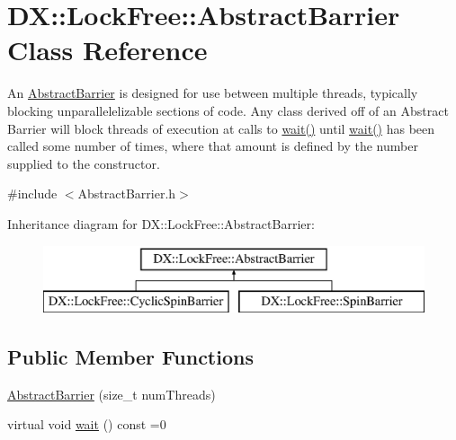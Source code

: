 \hypertarget{class_d_x_1_1_lock_free_1_1_abstract_barrier}{\section{D\-X\-:\-:Lock\-Free\-:\-:Abstract\-Barrier Class Reference}
\label{class_d_x_1_1_lock_free_1_1_abstract_barrier}
}


An \hyperlink{class_d_x_1_1_lock_free_1_1_abstract_barrier}{Abstract\-Barrier} is designed for use between multiple threads, typically blocking unparallelelizable sections of code. Any class derived off of an Abstract Barrier will block threads of execution at calls to \hyperlink{class_d_x_1_1_lock_free_1_1_abstract_barrier_a9040adf7507467e5a653bdaf2fbd17a6}{wait()} until \hyperlink{class_d_x_1_1_lock_free_1_1_abstract_barrier_a9040adf7507467e5a653bdaf2fbd17a6}{wait()} has been called some number of times, where that amount is defined by the number supplied to the constructor.  




{\ttfamily \#include $<$Abstract\-Barrier.\-h$>$}

Inheritance diagram for D\-X\-:\-:Lock\-Free\-:\-:Abstract\-Barrier\-:\begin{figure}[H]
\begin{center}
\leavevmode
\includegraphics[height=2.000000cm]{class_d_x_1_1_lock_free_1_1_abstract_barrier}
\end{center}
\end{figure}
\subsection*{Public Member Functions}
\begin{DoxyCompactItemize}
\item 
\hyperlink{class_d_x_1_1_lock_free_1_1_abstract_barrier_a57ea820cef85c23cd631f56956ad667f}{Abstract\-Barrier} (size\-\_\-t num\-Threads)
\item 
virtual void \hyperlink{class_d_x_1_1_lock_free_1_1_abstract_barrier_a9040adf7507467e5a653bdaf2fbd17a6}{wait} () const =0
\end{DoxyCompactItemize}
